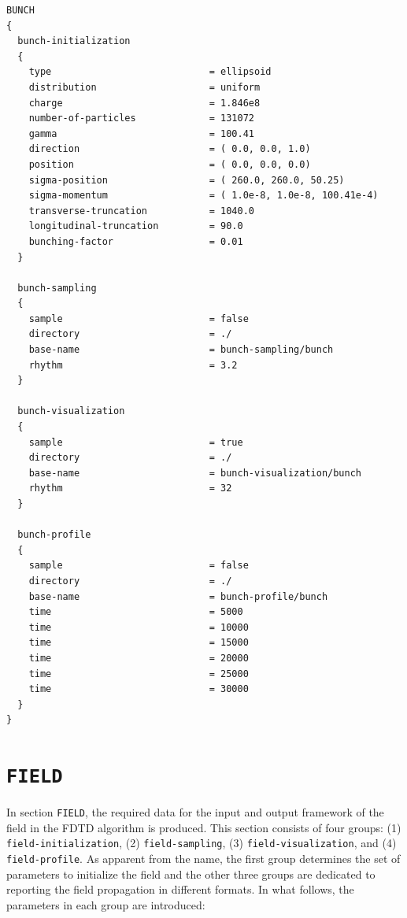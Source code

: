 \begin{snugshade}
\begin{Verbatim}[fontsize=\small, tabsize = 4]
BUNCH
{
  bunch-initialization
  {
    type                            = ellipsoid
    distribution                    = uniform
    charge                          = 1.846e8
    number-of-particles             = 131072
    gamma                           = 100.41
    direction                       = ( 0.0, 0.0, 1.0)
    position                        = ( 0.0, 0.0, 0.0)
    sigma-position                  = ( 260.0, 260.0, 50.25)
    sigma-momentum                  = ( 1.0e-8, 1.0e-8, 100.41e-4)
    transverse-truncation           = 1040.0
    longitudinal-truncation         = 90.0
    bunching-factor                 = 0.01
  }

  bunch-sampling
  {
    sample                          = false
    directory                       = ./
    base-name                       = bunch-sampling/bunch
    rhythm                          = 3.2
  }

  bunch-visualization
  {
    sample                          = true
    directory                       = ./
    base-name                       = bunch-visualization/bunch
    rhythm                          = 32
  }

  bunch-profile
  {
    sample                          = false
    directory                       = ./
    base-name                       = bunch-profile/bunch
    time                            = 5000
    time                            = 10000
    time                            = 15000
    time                            = 20000
    time                            = 25000
    time                            = 30000
  }
}
\end{Verbatim}
\end{snugshade}

\section{\texttt{FIELD}}

In section \texttt{FIELD}, the required data for the input and output framework of the field in the FDTD algorithm is produced. %
This section consists of four groups: (1) \texttt{field-initialization}, (2) \texttt{field-sampling}, (3) \texttt{field-visualization}, and (4) \texttt{field-profile}. %
As apparent from the name, the first group determines the set of parameters to initialize the field and the other three groups are dedicated to reporting the field propagation in different formats. %
In what follows, the parameters in each group are introduced:

